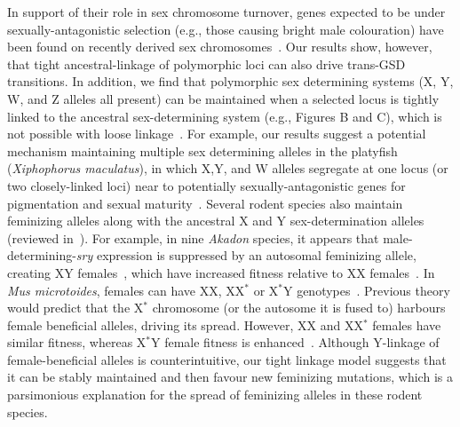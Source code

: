 \documentclass[10pt,letterpaper]{article}
\begin{document}
In support of their role in sex chromosome turnover, genes expected to be under sexually-antagonistic selection (e.g., those causing bright male colouration) have been found on recently derived sex chromosomes~\cite{Lindholm:2002dw,Tripathi:2009cw,Ser:2010iq}. 
Our results show, however, that tight ancestral-linkage of polymorphic loci can also drive trans-GSD transitions. 
In addition, we find that polymorphic sex determining systems (X, Y, W, and Z alleles all present) can be maintained when a selected locus is tightly linked to the ancestral sex-determining system (e.g., Figures B and C), which is not possible with loose linkage~\cite{vanDoorn:2010hu}. 
For example, our results suggest a potential mechanism maintaining multiple sex determining alleles in the platyfish (\textit{Xiphophorus maculatus}), in which X,Y, and W alleles segregate at one locus (or two closely-linked loci) near to potentially sexually-antagonistic genes for pigmentation and sexual maturity~\cite{Kallman1965,Kallman1968, Volff2001, Schultheis2006}.
Several rodent species also maintain feminizing alleles along with the ancestral X and Y sex-determination alleles (reviewed in~\cite{Fredga1994}). 
For example, in nine \textit{Akadon} species, it appears that male-determining-\textit{sry} expression is suppressed by an autosomal feminizing allele, creating XY females~\cite{Bianchi2002,Sanchez2010}, which have increased fitness relative to XX females~\cite{Hoekstra2001}. 
In \textit{Mus microtoides}, females can have XX, XX$^\ast$ or X$^\ast$Y genotypes~\cite{Veyrunes2010}. 
Previous theory would predict that the X$^\ast$ chromosome (or the autosome it is fused to) harbours female beneficial alleles, driving its spread. 
However, XX and XX$^\ast$ females have similar fitness, whereas X$^\ast$Y female fitness is enhanced~\cite{Saunders2014,Saunders2016, Veyrunes2017}.
Although Y-linkage of female-beneficial alleles is counterintuitive, our tight linkage model suggests that it can be stably maintained and then favour new feminizing mutations, which is a parsimonious explanation for the spread of feminizing alleles in these rodent species. 
\end{document}
